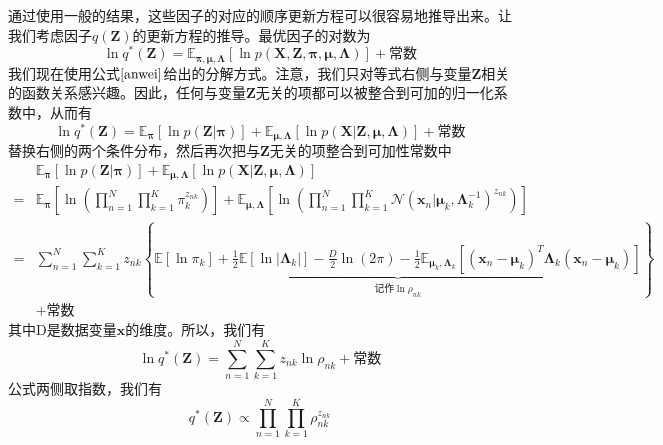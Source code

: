 通过使用一般的结果，这些因子的对应的顺序更新方程可以很容易地推导出来。让我们考虑因子$q(\boldsymbol{Z})$的更新方程的推导。最优因子的对数为
\begin{equation}
	\ln q^*(\boldsymbol{Z})=\mathbb{E}_{\boldsymbol{\pi},\boldsymbol{\mu},\boldsymbol{\Lambda}}[\ln p(\boldsymbol{X},\boldsymbol{Z},\boldsymbol{\pi},\boldsymbol{\mu},\boldsymbol{\Lambda})]+\text{常数}
\end{equation}
我们现在使用公式$\ref{anwei}$给出的分解方式。注意，我们只对等式右侧与变量$\boldsymbol{Z}$相关的函数关系感兴趣。因此，任何与变量$\boldsymbol{Z}$无关的项都可以被整合到可加的归一化系数中，从而有
\begin{equation}
	\ln q^*(\boldsymbol{Z})=\mathbb{E}_{\boldsymbol{\pi}}[\ln p(\boldsymbol{Z}|\boldsymbol{\pi})]+\mathbb{E}_{\boldsymbol{\mu},\boldsymbol{\Lambda}}[\ln p(\boldsymbol{X}|\boldsymbol{Z},\boldsymbol{\mu},\boldsymbol{\Lambda})]+\text{常数}
\end{equation}
替换右侧的两个条件分布，然后再次把与$\boldsymbol{Z}$无关的项整合到可加性常数中
\begin{equation}
\label{wencun}
	\begin{aligned}
		&\mathbb{E}_{\boldsymbol{\pi}}[\ln p(\boldsymbol{Z}|\boldsymbol{\pi})]+\mathbb{E}_{\boldsymbol{\mu},\boldsymbol{\Lambda}}[\ln p(\boldsymbol{X}|\boldsymbol{Z},\boldsymbol{\mu},\boldsymbol{\Lambda})]\\
		=&\mathbb{E}_{\boldsymbol{\pi}}\left[\ln \left(\prod_{n=1}^{N}\prod_{k=1}^{K}\pi_k^{z_{nk}}\right)\right]+\mathbb{E}_{\boldsymbol{\mu},\boldsymbol{\Lambda}}\left[\ln \left(\prod_{n=1}^{N}\prod_{k=1}^{K}\mathcal{N}(\boldsymbol{x}_n|\boldsymbol{\mu}_k,\boldsymbol{\Lambda}_k^{-1})^{z_{nk}}\right)\right]\\
		=&\sum_{n=1}^{N}\sum_{k=1}^{K}z_{nk}\left\{\underbrace{\mathbb{E}[\ln \pi_k]+\frac{1}{2}\mathbb{E}[\ln|\boldsymbol{\Lambda}_k|]-\frac{D}{2}\ln(2\pi)-\frac{1}{2}\mathbb{E}_{\boldsymbol{\mu}_k,\boldsymbol{\Lambda}_k}[(\boldsymbol{x}_n-\boldsymbol{\mu}_k)^T\boldsymbol{\Lambda}_k(\boldsymbol{x}_n-\boldsymbol{\mu}_k)]}_{\text{记作}\ln \rho_{nk}}  \right\}\\
		 &+\text{常数}
	\end{aligned}
\end{equation}
其中D是数据变量$\boldsymbol{x}$的维度。所以，我们有
\begin{equation}
	\ln q^*(\boldsymbol{Z})=\sum_{n=1}^{N}\sum_{k=1}^{K}z_{nk}\ln \rho_{nk}+\text{常数}
\end{equation}
公式两侧取指数，我们有
\begin{equation}
	q^*(\boldsymbol{Z})\propto \prod_{n=1}^{N}\prod_{k=1}^{K}\rho_{nk}^{z_{nk}}
\end{equation}
